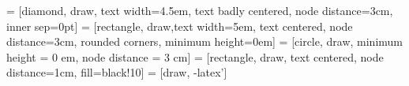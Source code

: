  = [diamond, draw, text width=4.5em, text badly centered, node distance=3cm, inner sep=0pt]
 = [rectangle, draw,text width=5em, text centered, node distance=3cm, rounded corners, minimum height=0em]
 = [circle, draw, minimum height = 0 em, node distance = 3 cm]
 = [rectangle, draw, text centered, node distance=1cm, fill=black!10]
 = [draw, -latex']
\newlength{\mytikzpicwidth}
\setlength{\mytikzpicwidth}{0.7\textwidth}
\newlength{\mytikzpicheight}
\setlength{\mytikzpicheight}{0.625\mytikzpicwidth}
    